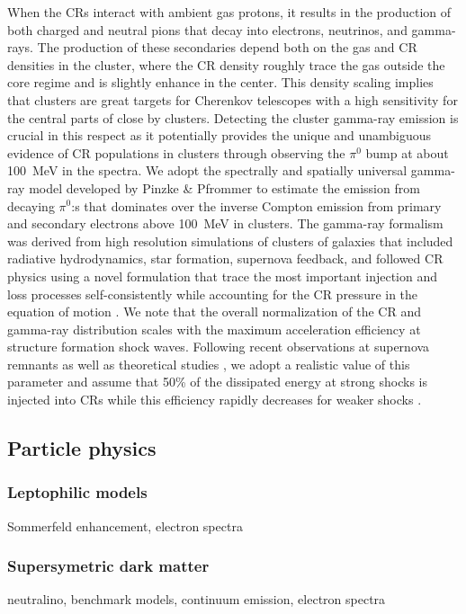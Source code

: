 \documentclass[10pt,aps,pra,reprint,amsmath,amsfonts,amssymb,showpacs]{revtex4-1}
\begin{document}
When the CRs interact with ambient gas protons, it results in the
production of both charged and neutral pions that decay into
electrons, neutrinos, and gamma-rays. The production of these
secondaries depend both on the gas and CR densities in the cluster,
where the CR density roughly trace the gas outside the core regime and
is slightly enhance in the center. This density scaling implies that
clusters are great targets for Cherenkov telescopes with a high
sensitivity for the central parts of close by clusters. Detecting the
cluster gamma-ray emission is crucial in this respect as it
potentially provides the unique and unambiguous evidence of CR
populations in clusters through observing the $\pi^0$ bump at about
100~MeV in the spectra. We adopt the spectrally and spatially
universal gamma-ray model developed by Pinzke \& Pfrommer
\cite{2010MNRAS.409..449P} to estimate the emission from decaying
$\pi^0$:s that dominates over the inverse Compton emission from
primary and secondary electrons above 100~MeV in clusters. The
gamma-ray formalism was derived from high resolution simulations of
clusters of galaxies that included radiative hydrodynamics, star
formation, supernova feedback, and followed CR physics using a novel
formulation that trace the most important injection and loss processes
self-consistently while accounting for the CR pressure in the equation
of motion
\cite{2008A&A...481...33J,2007A&A...473...41E,2006MNRAS.367..113P}.
We note that the overall normalization of the CR and gamma-ray
distribution scales with the maximum acceleration efficiency at
structure formation shock waves. Following recent observations at
supernova remnants \cite{2009Sci...325..719H} as well as theoretical
studies \cite{2005ApJ...620...44K}, we adopt a realistic value of this
parameter and assume that 50\% of the dissipated energy at strong
shocks is injected into CRs while this efficiency rapidly decreases
for weaker shocks \cite{2007A&A...473...41E}.
 

\subsection{Particle physics}

\subsubsection{Leptophilic models}
\label{sect:LP}
Sommerfeld enhancement, electron spectra

\subsubsection{Supersymetric dark matter}
neutralino, benchmark models, continuum emission, electron spectra 
\end{document}
